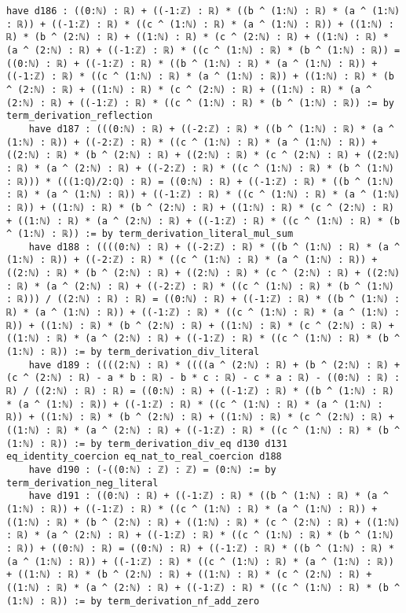 \documentclass{article}
\begin{document}
\begin{tcolorbox}[colback=white!10, width=\linewidth]
\begin{lstlisting}[language=Lean4]
    have d186 : ((0:ℕ) : ℝ) + ((-1:ℤ) : ℝ) * ((b ^ (1:ℕ) : ℝ) * (a ^ (1:ℕ) : ℝ)) + ((-1:ℤ) : ℝ) * ((c ^ (1:ℕ) : ℝ) * (a ^ (1:ℕ) : ℝ)) + ((1:ℕ) : ℝ) * (b ^ (2:ℕ) : ℝ) + ((1:ℕ) : ℝ) * (c ^ (2:ℕ) : ℝ) + ((1:ℕ) : ℝ) * (a ^ (2:ℕ) : ℝ) + ((-1:ℤ) : ℝ) * ((c ^ (1:ℕ) : ℝ) * (b ^ (1:ℕ) : ℝ)) = ((0:ℕ) : ℝ) + ((-1:ℤ) : ℝ) * ((b ^ (1:ℕ) : ℝ) * (a ^ (1:ℕ) : ℝ)) + ((-1:ℤ) : ℝ) * ((c ^ (1:ℕ) : ℝ) * (a ^ (1:ℕ) : ℝ)) + ((1:ℕ) : ℝ) * (b ^ (2:ℕ) : ℝ) + ((1:ℕ) : ℝ) * (c ^ (2:ℕ) : ℝ) + ((1:ℕ) : ℝ) * (a ^ (2:ℕ) : ℝ) + ((-1:ℤ) : ℝ) * ((c ^ (1:ℕ) : ℝ) * (b ^ (1:ℕ) : ℝ)) := by term_derivation_reflection
    have d187 : (((0:ℕ) : ℝ) + ((-2:ℤ) : ℝ) * ((b ^ (1:ℕ) : ℝ) * (a ^ (1:ℕ) : ℝ)) + ((-2:ℤ) : ℝ) * ((c ^ (1:ℕ) : ℝ) * (a ^ (1:ℕ) : ℝ)) + ((2:ℕ) : ℝ) * (b ^ (2:ℕ) : ℝ) + ((2:ℕ) : ℝ) * (c ^ (2:ℕ) : ℝ) + ((2:ℕ) : ℝ) * (a ^ (2:ℕ) : ℝ) + ((-2:ℤ) : ℝ) * ((c ^ (1:ℕ) : ℝ) * (b ^ (1:ℕ) : ℝ))) * (((1:ℚ)/2:ℚ) : ℝ) = ((0:ℕ) : ℝ) + ((-1:ℤ) : ℝ) * ((b ^ (1:ℕ) : ℝ) * (a ^ (1:ℕ) : ℝ)) + ((-1:ℤ) : ℝ) * ((c ^ (1:ℕ) : ℝ) * (a ^ (1:ℕ) : ℝ)) + ((1:ℕ) : ℝ) * (b ^ (2:ℕ) : ℝ) + ((1:ℕ) : ℝ) * (c ^ (2:ℕ) : ℝ) + ((1:ℕ) : ℝ) * (a ^ (2:ℕ) : ℝ) + ((-1:ℤ) : ℝ) * ((c ^ (1:ℕ) : ℝ) * (b ^ (1:ℕ) : ℝ)) := by term_derivation_literal_mul_sum
    have d188 : ((((0:ℕ) : ℝ) + ((-2:ℤ) : ℝ) * ((b ^ (1:ℕ) : ℝ) * (a ^ (1:ℕ) : ℝ)) + ((-2:ℤ) : ℝ) * ((c ^ (1:ℕ) : ℝ) * (a ^ (1:ℕ) : ℝ)) + ((2:ℕ) : ℝ) * (b ^ (2:ℕ) : ℝ) + ((2:ℕ) : ℝ) * (c ^ (2:ℕ) : ℝ) + ((2:ℕ) : ℝ) * (a ^ (2:ℕ) : ℝ) + ((-2:ℤ) : ℝ) * ((c ^ (1:ℕ) : ℝ) * (b ^ (1:ℕ) : ℝ))) / ((2:ℕ) : ℝ) : ℝ) = ((0:ℕ) : ℝ) + ((-1:ℤ) : ℝ) * ((b ^ (1:ℕ) : ℝ) * (a ^ (1:ℕ) : ℝ)) + ((-1:ℤ) : ℝ) * ((c ^ (1:ℕ) : ℝ) * (a ^ (1:ℕ) : ℝ)) + ((1:ℕ) : ℝ) * (b ^ (2:ℕ) : ℝ) + ((1:ℕ) : ℝ) * (c ^ (2:ℕ) : ℝ) + ((1:ℕ) : ℝ) * (a ^ (2:ℕ) : ℝ) + ((-1:ℤ) : ℝ) * ((c ^ (1:ℕ) : ℝ) * (b ^ (1:ℕ) : ℝ)) := by term_derivation_div_literal
    have d189 : ((((2:ℕ) : ℝ) * ((((a ^ (2:ℕ) : ℝ) + (b ^ (2:ℕ) : ℝ) + (c ^ (2:ℕ) : ℝ) - a * b : ℝ) - b * c : ℝ) - c * a : ℝ) - ((0:ℕ) : ℝ) : ℝ) / ((2:ℕ) : ℝ) : ℝ) = ((0:ℕ) : ℝ) + ((-1:ℤ) : ℝ) * ((b ^ (1:ℕ) : ℝ) * (a ^ (1:ℕ) : ℝ)) + ((-1:ℤ) : ℝ) * ((c ^ (1:ℕ) : ℝ) * (a ^ (1:ℕ) : ℝ)) + ((1:ℕ) : ℝ) * (b ^ (2:ℕ) : ℝ) + ((1:ℕ) : ℝ) * (c ^ (2:ℕ) : ℝ) + ((1:ℕ) : ℝ) * (a ^ (2:ℕ) : ℝ) + ((-1:ℤ) : ℝ) * ((c ^ (1:ℕ) : ℝ) * (b ^ (1:ℕ) : ℝ)) := by term_derivation_div_eq d130 d131 eq_identity_coercion eq_nat_to_real_coercion d188
    have d190 : (-((0:ℕ) : ℤ) : ℤ) = (0:ℕ) := by term_derivation_neg_literal
    have d191 : ((0:ℕ) : ℝ) + ((-1:ℤ) : ℝ) * ((b ^ (1:ℕ) : ℝ) * (a ^ (1:ℕ) : ℝ)) + ((-1:ℤ) : ℝ) * ((c ^ (1:ℕ) : ℝ) * (a ^ (1:ℕ) : ℝ)) + ((1:ℕ) : ℝ) * (b ^ (2:ℕ) : ℝ) + ((1:ℕ) : ℝ) * (c ^ (2:ℕ) : ℝ) + ((1:ℕ) : ℝ) * (a ^ (2:ℕ) : ℝ) + ((-1:ℤ) : ℝ) * ((c ^ (1:ℕ) : ℝ) * (b ^ (1:ℕ) : ℝ)) + ((0:ℕ) : ℝ) = ((0:ℕ) : ℝ) + ((-1:ℤ) : ℝ) * ((b ^ (1:ℕ) : ℝ) * (a ^ (1:ℕ) : ℝ)) + ((-1:ℤ) : ℝ) * ((c ^ (1:ℕ) : ℝ) * (a ^ (1:ℕ) : ℝ)) + ((1:ℕ) : ℝ) * (b ^ (2:ℕ) : ℝ) + ((1:ℕ) : ℝ) * (c ^ (2:ℕ) : ℝ) + ((1:ℕ) : ℝ) * (a ^ (2:ℕ) : ℝ) + ((-1:ℤ) : ℝ) * ((c ^ (1:ℕ) : ℝ) * (b ^ (1:ℕ) : ℝ)) := by term_derivation_nf_add_zero

\end{lstlisting}
\end{tcolorbox}
\end{document}
